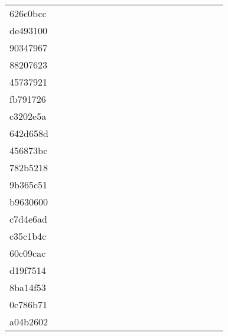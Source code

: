 \begin{table*}[htb]
\begin{tabular}{l|cccccccccccccccccc}
626c0bcc  & \C & \X & \X & \X & \X & \X & \X & \X & \X & \X & \X & \C & \C & \C & \C & \X & \X \\
de493100  & \C & \X & \X & \X & \X & \X & \X & \X & \X & \X & \X & \X & \X & \C & \C & \X & \X \\
90347967  & \C & \X & \X & \X & \X & \X & \X & \X & \X & \X & \X & \X & \X & \C & \C & \C & \X \\
88207623  & \C & \X & \X & \X & \X & \X & \X & \X & \X & \X & \X & \X & \X & \C & \C & \X & \X \\
45737921  & \C & \X & \C & \C & \X & \C & \X & \C & \C & \C & \C & \C & \C & \C & \C & \C & \C \\
fb791726  & \C & \X & \X & \X & \X & \C & \X & \X & \X & \X & \X & \C & \C & \C & \C & \C & \C \\
c3202e5a  & \C & \X & \X & \X & \X & \X & \X & \X & \X & \X & \X & \X & \X & \C & \C & \X & \X \\
642d658d  & \C & \C & \X & \C & \X & \X & \X & \X & \X & \X & \X & \X & \X & \C & \C & \C & \C \\
456873bc  & \C & \X & \X & \X & \X & \X & \X & \X & \X & \X & \X & \X & \X & \C & \C & \X & \X \\
782b5218  & \C & \X & \X & \X & \X & \X & \X & \X & \X & \X & \X & \X & \X & \C & \C & \C & \C \\
9b365c51  & \C & \X & \X & \X & \X & \X & \X & \X & \X & \X & \X & \X & \X & \C & \C & \X & \C \\
b9630600  & \X & \X & \X & \X & \X & \X & \X & \X & \X & \X & \X & \X & \X & \X & \X & \X & \X \\
c7d4e6ad  & \C & \C & \C & \C & \C & \C & \C & \C & \C & \C & \C & \C & \C & \C & \C & \C & \C \\
c35c1b4c  & \C & \X & \X & \X & \X & \X & \X & \X & \X & \X & \X & \X & \X & \C & \C & \X & \X \\
60c09cac  & \C & \X & \C & \X & \X & \C & \C & \C & \C & \C & \C & \C & \C & \C & \C & \C & \C \\
d19f7514  & \C & \X & \X & \X & \X & \C & \X & \C & \C & \C & \C & \C & \C & \C & \C & \C & \C \\
8ba14f53  & \C & \X & \X & \X & \X & \X & \X & \X & \X & \X & \X & \X & \X & \C & \C & \X & \X \\
0c786b71  & \C & \X & \X & \X & \X & \X & \X & \C & \X & \C & \C & \C & \C & \C & \C & \C & \C \\
a04b2602  & \C & \X & \X & \X & \X & \X & \X & \X & \X & \X & \X & \X & \X & \X & \C & \X & \X \\

\end{tabular}
\end{table*}

